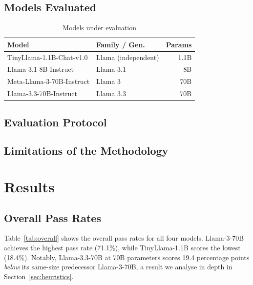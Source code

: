 \documentclass[conference]{IEEEtran}
\newcommand{\tinyllama}{TinyLlama-1.1B}
\newcommand{\llamaB}{Llama-3-70B}
\newcommand{\llamaC}{Llama-3.3-70B}
\begin{document}
\subsection{Models Evaluated}

\begin{table}[htbp]
  \caption{Models under evaluation}
  \label{tab:models}
  \centering
  \small
  \begin{tabular}{llr}
    \toprule
    \textbf{Model} & \textbf{Family / Gen.} & \textbf{Params} \\
    \midrule
    TinyLlama-1.1B-Chat-v1.0     & Llama (independent) & 1.1B \\
    Llama-3.1-8B-Instruct        & Llama 3.1           & 8B   \\
    Meta-Llama-3-70B-Instruct    & Llama 3             & 70B  \\
    Llama-3.3-70B-Instruct       & Llama 3.3           & 70B  \\
    \bottomrule
  \end{tabular}
\end{table}

\subsection{Evaluation Protocol}

\subsection{Limitations of the Methodology}

\section{Results}
\label{sec:results}

\subsection{Overall Pass Rates}

Table~\ref{tab:overall} shows the overall pass rates for all four
models. \llamaB{} achieves the highest pass rate (71.1\%), while
\tinyllama{} scores the lowest (18.4\%). Notably, \llamaC{} at
70B parameters scores 19.4 percentage points \emph{below} its same-size
predecessor \llamaB{}, a result we analyse in depth in
Section~\ref{sec:heuristics}.
\end{document}

